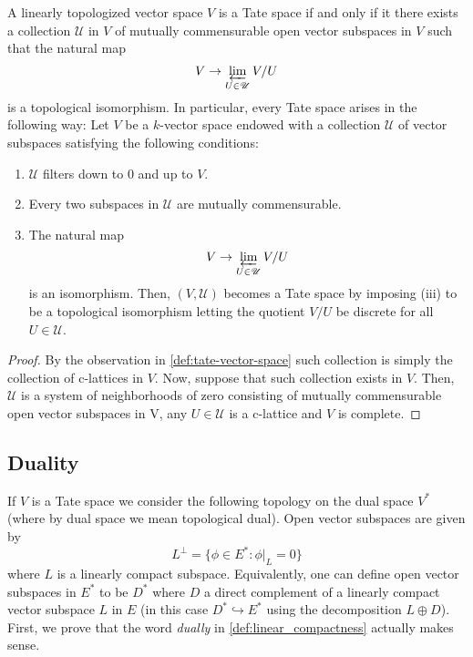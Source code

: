 \begin{proposition}\label{prop:characterization-of-tate-spaces-as-inverse-limits}
	A linearly topologized vector space $V$ is a Tate space if and only if it there exists a collection $\mathscr{U}$ in $V$ of mutually commensurable open vector subspaces in $V$ such that the natural map
	\[
		V \to \varprojlim_{U \in \mathscr{U}} V/U
	\]
	is a topological isomorphism. In particular, every Tate space arises in the following way: Let $V$ be a $k$-vector space endowed with a collection $\mathscr{U}$ of vector subspaces satisfying the following conditions:
	\begin{enumerate}[label = (\roman*)]
		\item $\mathscr{U}$ filters down to $0$ and up to $V$.
		\item Every two subspaces in $\mathscr{U}$ are mutually commensurable.
		\item The natural map
		\[
			V \to \varprojlim_{U\in \mathscr{U}} V/U
		\]
		is an isomorphism. Then, $(V, \mathscr{U})$ becomes a Tate space by imposing (iii) to be a topological isomorphism letting the quotient $V/U$ be discrete for all $U \in \mathscr{U}$.
	\end{enumerate}
	
\end{proposition}
\begin{proof}
	By the observation in \cref{def:tate-vector-space} such collection is simply the collection of c-lattices in $V$. Now, suppose that such collection exists in $V$. Then, $\mathscr{U}$ is a system of neighborhoods of zero consisting of mutually commensurable open vector subspaces in V, any $U \in \mathscr{U}$ is a c-lattice and $V$ is complete.
\end{proof}


\subsection*{Duality}
If $V$ is a Tate space we consider the following topology on the dual space $V^{*}$ (where by dual space we mean topological dual). Open vector subspaces are given by
\[
	L^{\perp} = \{\phi\in E^{*} \colon \phi\lvert_{L} = 0\}
\]
where $L$ is a linearly compact subspace. Equivalently, one can define open vector subspaces in $E^{*}$ to be $D^{*}$ where $D$ a direct complement of a linearly compact vector subspace $L$ in $E$ (in this case $D^{*} \hookrightarrow E^{*}$ using the decomposition $L\oplus D$).  \\
First, we prove that the word \emph{dually} in \cref{def:linear_compactness} actually makes sense. 

